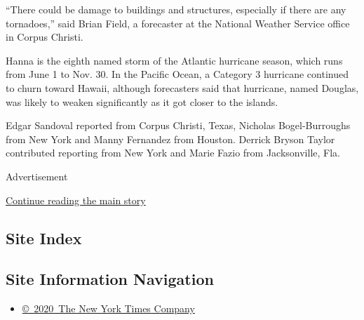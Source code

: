 ``There could be damage to buildings and structures, especially if there
are any tornadoes,'' said Brian Field, a forecaster at the National
Weather Service office in Corpus Christi.

Hanna is the eighth named storm of the Atlantic hurricane season, which
runs from June 1 to Nov. 30. In the Pacific Ocean, a Category 3
hurricane continued to churn toward Hawaii, although forecasters said
that hurricane, named Douglas, was likely to weaken significantly as it
got closer to the islands.

Edgar Sandoval reported from Corpus Christi, Texas, Nicholas
Bogel-Burroughs from New York and Manny Fernandez from Houston. Derrick
Bryson Taylor contributed reporting from New York and Marie Fazio from
Jacksonville, Fla.

Advertisement

\protect\hyperlink{after-bottom}{Continue reading the main story}

\hypertarget{site-index}{%
\subsection{Site Index}\label{site-index}}

\hypertarget{site-information-navigation}{%
\subsection{Site Information
Navigation}\label{site-information-navigation}}

\begin{itemize}
\tightlist
\item
  \href{https://help.nytimes3xbfgragh.onion/hc/en-us/articles/115014792127-Copyright-notice}{©~2020~The
  New York Times Company}
\end{itemize}

